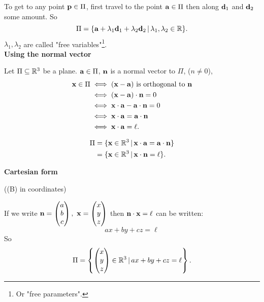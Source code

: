 \documentclass[10pt, a4paper]{article}
\begin{document}
To get to any point $\mathbf{p} \in \Pi$, first travel to the point $\mathbf{a} \in \Pi$ then along $\mathbf{d}_1$ and $\mathbf{d}_2$ some amount. So
\[
\Pi = \{\mathbf{a} + \lambda_1\mathbf{d}_1 + \lambda_2\mathbf{d}_2\,|\,\lambda_1, \lambda_2 \in \mathbb{R}\}.
\]
$\lambda_1, \lambda_2$ are called "free variables"\footnote{Or "free parameters".}. \\

\textbf{Using the normal vector}

Let $\Pi \subseteq \mathbb{R} ^ 3$ be a plane. $\mathbf{a} \in \Pi$, $\mathbf{n}$ is a normal vector to $\Pi$, ($n \neq 0$), 
\begin{align*}
    \mathbf{x} \in \Pi &\iff (\mathbf{x - a}) \text{ is orthogonal to } \mathbf{n} \\
    &\iff (\mathbf{x - a}) \cdot \mathbf{n} = 0 \\
    &\iff \mathbf{x \cdot a} - \mathbf{a \cdot n} = 0 \\ 
    &\iff \mathbf{x \cdot a} = \mathbf{a \cdot n} \\ 
    &\iff \mathbf{x \cdot a} = \ell.
\end{align*}

\begin{align*}
    \Pi &= \{\mathbf{x} \in \mathbb{R} ^ 3\,|\,\mathbf{x\cdot a} = \mathbf{a \cdot n}\} \\
    &= \{\mathbf{x} \in \mathbb{R} ^ 3\,|\, \mathbf{x \cdot n} = \ell\}.
\end{align*}

\textbf{Cartesian form}

((B) in coordinates)

If we write $\mathbf{n} = \begin{pmatrix}
    a \\ b \\ c
\end{pmatrix},\ \mathbf{x} = \begin{pmatrix}
    x \\ y \\ z
\end{pmatrix}$ then $\mathbf{n \cdot x} = \ell$ can be written:
\[
ax + by + cz = \ell
\]
So
\[
\Pi = \left\{\begin{pmatrix}
    x \\ y \\ z
\end{pmatrix} \in \mathbb{R} ^ 3\,|\, ax + by + cz = \ell\right\}.
\]
\end{document}
